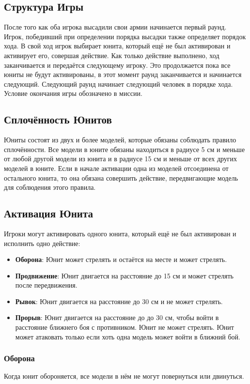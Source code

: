 \documentclass[twocolumn]{article}
\newcommand{\h}[1]{\textbf{#1}}
\begin{document}
\subsection{Структура Игры}
После того как оба игрока высадили свои армии начинается первый раунд. Игрок, победивший при определении порядка высадки также определяет порядок хода. В свой ход игрок выбирает юнита, который ещё не был активирован и активирует его, совершая действие. Как только действие выполнено, ход заканчивается и передаётся следующему игроку. Это продолжается пока все юниты не будут активированы, в этот момент раунд заканчивается и начинается следующий. Следующий раунд начинает следующий человек в порядке хода. Условие окончания игры обозначено в миссии.

\subsection{Сплочённость Юнитов}
Юниты состоят из двух и более моделей, которые обязаны соблюдать правило сплочённости.
Все модели в юните обязаны находиться в радиусе 5 см и меньше от любой другой модели из юнита и в радиусе 15 см и меньше от всех других моделей в юните.
Если в начале активации одна из моделей отсоединена от остального юнита, то она обязана совершить действие, передвигающие модель для соблюдения этого правила.

\subsection{Активация Юнита}
Игроки могут активировать одного юнита, который ещё не был активирован и исполнить одно действие:
\begin{itemize}
    \item \h{Оборона}: Юнит может стрелять и остаётся на месте и может стрелять.
    \item \h{Продвижение}: Юнит двигается на расстояние до 15 см и может стрелять после передвижения.
    \item \h{Рывок}: Юнит двигается на расстояние до 30 см и не может стрелять.
    \item \h{Прорыв}: Юнит двигается на расстояние до до 30 см, чтобы войти в расстояние ближнего боя с противником. Юнит не может стрелять. Юнит может атаковать только если хоть одна модель может войти в ближний бой.
\end{itemize}

\newpage


\subsubsection{Оборона}
Когда юнит обороняется, все модели в нём не могут повернуться или двинуться.
\end{document}
